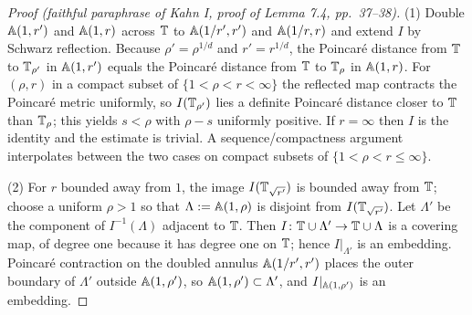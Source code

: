 \documentclass[11pt,reqno]{amsart}
\theoremstyle{definition}
\theoremstyle{remark}
\begin{document}
\begin{proof}[Proof (faithful paraphrase of Kahn I, proof of Lemma 7.4, pp.~37--38)]
(1) Double \(\mathbb{A}(1,r')\) and \(\mathbb{A}(1,r)\) across \(\mathbb{T}\) to
\(\mathbb{A}(1/r',r')\) and \(\mathbb{A}(1/r,r)\) and extend \(I\) by Schwarz
reflection.  Because \(\rho'=\rho^{1/d}\) and \(r'=r^{1/d}\), the
Poincar\'e distance from \(\mathbb{T}\) to \(\mathbb{T}_{\rho'}\) in \(\mathbb{A}(1,r')\)
equals the Poincar\'e distance from \(\mathbb{T}\) to \(\mathbb{T}_{\rho}\) in
\(\mathbb{A}(1,r)\).  For \((\rho,r)\) in a compact subset of
\(\{1<\rho<r<\infty\}\) the reflected map contracts the Poincar\'e
metric uniformly, so \(I(\mathbb{T}_{\rho'})\) lies a definite Poincar\'e
distance closer to \(\mathbb{T}\) than \(\mathbb{T}_\rho\); this yields \(s<\rho\)
with \(\rho-s\) uniformly positive.  If \(r=\infty\) then \(I\) is the
identity and the estimate is trivial.  A sequence/compactness argument
interpolates between the two cases on compact subsets of
\(\{1<\rho<r\le\infty\}\).

(2) For \(r\) bounded away from \(1\), the image \(I(\mathbb{T}_{\sqrt{r'}})\)
is bounded away from \(\mathbb{T}\); choose a uniform \(\rho>1\) so that
\(\Lambda:=\mathbb{A}(1,\rho)\) is disjoint from \(I(\mathbb{T}_{\sqrt{r'}})\).  Let
\(\Lambda'\) be the component of \(I^{-1}(\Lambda)\) adjacent to
\(\mathbb{T}\).  Then \(I\colon\mathbb{T}\cup\Lambda'\to\mathbb{T}\cup\Lambda\) is a covering
map, of degree one because it has degree one on \(\mathbb{T}\); hence
\(I|_{\Lambda'}\) is an embedding.  Poincar\'e contraction on the
doubled annulus \(\mathbb{A}(1/r',r')\) places the outer boundary of
\(\Lambda'\) outside \(\mathbb{A}(1,\rho')\), so
\(\mathbb{A}(1,\rho')\subset\Lambda'\), and \(I|_{\mathbb{A}(1,\rho')}\) is an
embedding.
\end{proof}
\end{document}
